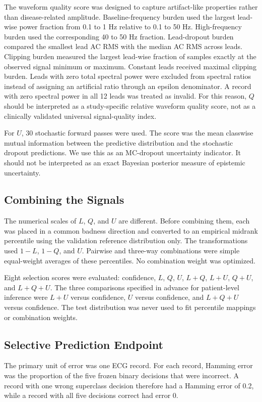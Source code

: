 \documentclass[journal]{IEEEtran}
\begin{document}
The waveform quality score was designed to capture artifact-like properties rather than disease-related amplitude. Baseline-frequency burden used the largest lead-wise power fraction from 0.1 to 1 Hz relative to 0.1 to 50 Hz. High-frequency burden used the corresponding 40 to 50 Hz fraction. Lead-dropout burden compared the smallest lead AC RMS with the median AC RMS across leads. Clipping burden measured the largest lead-wise fraction of samples exactly at the observed signal minimum or maximum. Constant leads received maximal clipping burden. Leads with zero total spectral power were excluded from spectral ratios instead of assigning an artificial ratio through an epsilon denominator. A record with zero spectral power in all 12 leads was treated as invalid. For this reason, $Q$ should be interpreted as a study-specific relative waveform quality score, not as a clinically validated universal signal-quality index.

For $U$, 30 stochastic forward passes were used. The score was the mean classwise mutual information between the predictive distribution and the stochastic dropout predictions. We use this as an MC-dropout uncertainty indicator. It should not be interpreted as an exact Bayesian posterior measure of epistemic uncertainty.

\subsection{Combining the Signals}
The numerical scales of $L$, $Q$, and $U$ are different. Before combining them, each was placed in a common badness direction and converted to an empirical midrank percentile using the validation reference distribution only. The transformations used $1-L$, $1-Q$, and $U$. Pairwise and three-way combinations were simple equal-weight averages of these percentiles. No combination weight was optimized.

Eight selection scores were evaluated: confidence, $L$, $Q$, $U$, $L+Q$, $L+U$, $Q+U$, and $L+Q+U$. The three comparisons specified in advance for patient-level inference were $L+U$ versus confidence, $U$ versus confidence, and $L+Q+U$ versus confidence. The test distribution was never used to fit percentile mappings or combination weights.

\subsection{Selective Prediction Endpoint}
The primary unit of error was one ECG record. For each record, Hamming error was the proportion of the five frozen binary decisions that were incorrect. A record with one wrong superclass decision therefore had a Hamming error of 0.2, while a record with all five decisions correct had error 0.
\end{document}
